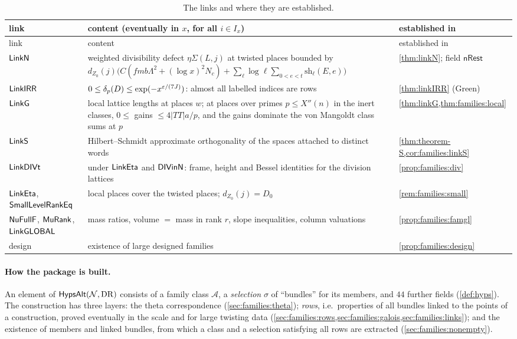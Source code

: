 {\small
\begin{longtable}{>{\raggedright\arraybackslash}p{}>{\raggedright\arraybackslash}p{}>{\raggedright\arraybackslash}p{}}
\caption{The links and where they are established.}\label{tab:families:links}\\
\toprule
link & content (eventually in $x$, for all $i\in I_x$) & established in\\
\midrule
\endfirsthead
\toprule
link & content & established in\\
\midrule
\endhead
$\mathsf{LinkN}$ & weighted divisibility defect $\eta\Sigma(L,j)$ at twisted places bounded by
$d_{Z_0}(j)\bigl(C(fmb\Lambda^2+(\log x)^2N_c)+\sum_\ell\log\ell\sum_{0<e<t}\mathrm{sh}_\ell(E,e)\bigr)$
& \cref{thm:linkN}; field $\mathsf{nRest}$\\
$\mathsf{LinkIRR}$ & $0\le\delta_p(D)\le\exp(-x^{\varepsilon/(7J)})$: almost all labelled indices are rows
& \cref{thm:linkIRR} (Green)\\
$\mathsf{LinkG}$ & local lattice lengths at places $w$; at places over primes $p\le X''(n)$ in the inert
classes, $0\le$ gains $\le4|TT|a/p$, and the gains dominate the von Mangoldt class sums at $p$
& \cref{thm:linkG,thm:families:local}\\
$\mathsf{LinkS}$ & Hilbert--Schmidt approximate orthogonality of the spaces attached to distinct words
& \cref{thm:theorem-S,cor:families:linkS}\\
$\mathsf{LinkDIVt}$ & under $\mathsf{LinkEta}$ and $\mathsf{DIVinN}$: frame, height and Bessel identities for
the division lattices & \cref{prop:families:div}\\
$\mathsf{LinkEta}$, $\mathsf{SmallLevelRankEq}$ & local places cover the twisted places;
$d_{Z_0}(j)=D_0$ & \cref{rem:families:small}\\
$\mathsf{NuFullF}$, $\mathsf{MuRank}$, $\mathsf{LinkGLOBAL}$ & mass ratios, volume $=$ mass in rank $r$, slope
inequalities, column valuations & \cref{prop:families:famgl}\\
design & existence of large designed families & \cref{prop:families:design}\\
\bottomrule
\end{longtable}
}

\paragraph{How the package is built.}
An element of $\mathsf{HypsAlt}(\mathcal N,\mathrm{DR})$ consists of a family class $\mathcal A$, a
\emph{selection} $\sigma$ of ``bundles'' for its members, and $44$ further fields (\cref{def:hyps}). The
construction has three layers: the theta correspondence (\cref{sec:families:theta}); \emph{rows}, i.e.\
properties of all bundles linked to the points of a construction, proved eventually in the scale and for large
twisting data (\cref{sec:families:rows,sec:families:galois,sec:families:links}); and the existence of members and
linked bundles, from which a class and a selection satisfying all rows are extracted
(\cref{sec:families:nonempty}).

